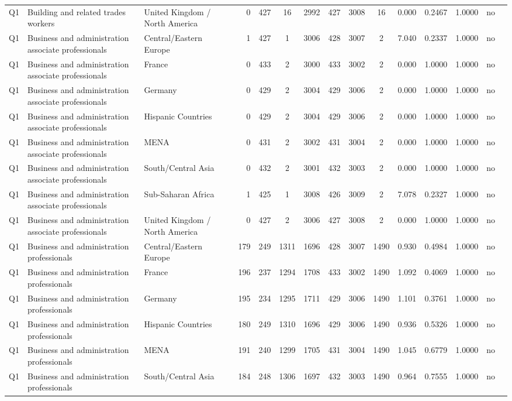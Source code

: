 \begin{longtable}{lllrcccccccccll}
Q1 & Building and related trades workers & United Kingdom / North America & 0 & 427 & 16 & 2992 & 427 & 3008 & 16 & 0.000 & 0.2467 & 1.0000 & no \\
Q1 & Business and administration associate professionals & Central/Eastern Europe & 1 & 427 & 1 & 3006 & 428 & 3007 & 2 & 7.040 & 0.2337 & 1.0000 & no \\
Q1 & Business and administration associate professionals & France & 0 & 433 & 2 & 3000 & 433 & 3002 & 2 & 0.000 & 1.0000 & 1.0000 & no \\
Q1 & Business and administration associate professionals & Germany & 0 & 429 & 2 & 3004 & 429 & 3006 & 2 & 0.000 & 1.0000 & 1.0000 & no \\
Q1 & Business and administration associate professionals & Hispanic Countries & 0 & 429 & 2 & 3004 & 429 & 3006 & 2 & 0.000 & 1.0000 & 1.0000 & no \\
Q1 & Business and administration associate professionals & MENA & 0 & 431 & 2 & 3002 & 431 & 3004 & 2 & 0.000 & 1.0000 & 1.0000 & no \\
Q1 & Business and administration associate professionals & South/Central Asia & 0 & 432 & 2 & 3001 & 432 & 3003 & 2 & 0.000 & 1.0000 & 1.0000 & no \\
Q1 & Business and administration associate professionals & Sub-Saharan Africa & 1 & 425 & 1 & 3008 & 426 & 3009 & 2 & 7.078 & 0.2327 & 1.0000 & no \\
Q1 & Business and administration associate professionals & United Kingdom / North America & 0 & 427 & 2 & 3006 & 427 & 3008 & 2 & 0.000 & 1.0000 & 1.0000 & no \\
Q1 & Business and administration professionals & Central/Eastern Europe & 179 & 249 & 1311 & 1696 & 428 & 3007 & 1490 & 0.930 & 0.4984 & 1.0000 & no \\
Q1 & Business and administration professionals & France & 196 & 237 & 1294 & 1708 & 433 & 3002 & 1490 & 1.092 & 0.4069 & 1.0000 & no \\
Q1 & Business and administration professionals & Germany & 195 & 234 & 1295 & 1711 & 429 & 3006 & 1490 & 1.101 & 0.3761 & 1.0000 & no \\
Q1 & Business and administration professionals & Hispanic Countries & 180 & 249 & 1310 & 1696 & 429 & 3006 & 1490 & 0.936 & 0.5326 & 1.0000 & no \\
Q1 & Business and administration professionals & MENA & 191 & 240 & 1299 & 1705 & 431 & 3004 & 1490 & 1.045 & 0.6779 & 1.0000 & no \\
Q1 & Business and administration professionals & South/Central Asia & 184 & 248 & 1306 & 1697 & 432 & 3003 & 1490 & 0.964 & 0.7555 & 1.0000 & no \\

\end{longtable}
